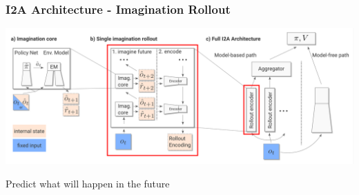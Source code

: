 \begin{frame}
    \frametitle{I2A Architecture - Imagination Rollout}


\includegraphics[width=\columnwidth]{./Images/i2a_all_imagination_rollout.png}%

\begin{PraesentationAufzaehlung}
	\item Predict what will happen in the future
\end{PraesentationAufzaehlung}
    
\end{frame}
\clearpage


